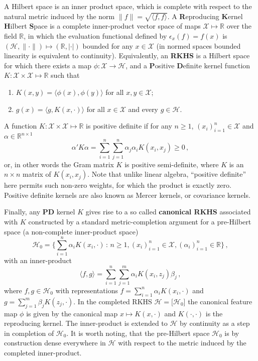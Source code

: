\documentclass{ITaSconf}
\newcommand{\Hcal}{\mathcal{H}}
\newcommand{\Xcal}{\mathcal{X}}
\newcommand{\Real}{\mathbb{R}}
\begin{document}
A Hilbert space is an inner product space, which is complete with respect to the
natural metric induced by the norm $ \|f\| = \sqrt{\langle f, f\rangle} $. A \textbf{R}eproducing
\textbf{K}ernel \textbf{H}ilbert \textbf{S}pace is a complete inner-product vector
space of maps $\Xcal \mapsto \Real$ over the field $\Real$, in which the evaluation
functional defined by $\epsilon_x(f) = f(x)$ is $(\Hcal, \|\cdot\|) \mapsto (\Real, |\cdot|)$
bounded for any $x\in \Xcal$ (in normed spaces bounded linearity is equivalent to
continuity). Equivalently, an \textbf{RKHS} is a Hilbert space for which there exists
a map $\phi:\Xcal\to\Hcal$, and a \textbf{P}ositive \textbf{D}efinite kernel function
$K:\Xcal \times \Xcal \mapsto \Real$ such that \begin{enumerate}
  \item $K(x,y) = \langle \phi(x), \phi(y) \rangle$ for all $x, y\in \Xcal$;
  \item $g(x) = \langle g, K(x, \cdot)\rangle$ for all $x\in \Xcal$ and every
  $g\in \Hcal$.
\end{enumerate}
A function $K:\Xcal \times \Xcal \mapsto \Real$ is positive definite if for any
$n\geq1$, $(x_i)_{i=1}^n \in \Xcal$ and $\alpha \in \Real^{n\times 1}$
\begin{equation*}
  \alpha'K\alpha
    = \sum_{i=1}^n \sum_{j=1}^n \alpha_j \alpha_i K(x_i, x_j)
    \geq 0
    \,,
\end{equation*}
or, in other words the Gram matrix $K$ is positive semi-definite, where $K$ is an
$n \times n$ matrix of $K(x_i, x_j)$. Note that unlike linear algebra, ``positive
definite'' here permits such non-zero weights, for which the product is exactly
zero. Positive definite kernels are also known as Mercer kernels, or covariance
kernels.

Finally, any \textbf{PD} kernel $K$ gives rise to a so called \textbf{canonical RKHS}
associated with $K$ constructed by a standard metric-completion argument for a pre-Hilbert
space (a non-complete inner-product space)
\begin{equation*}
\Hcal_0
  = \bigl\{
    \sum_{i=1}^n \alpha_i K(x_i, \cdot)
    \,:\, n\geq1, (x_i)_{i=1}^n \in \Xcal, (\alpha_i)_{i=1}^n\in \Real
  \bigr\} \,,
\end{equation*}
with an inner-product 
\begin{equation*}
  \langle f, g \rangle = \sum_{i=1}^n \sum_{j=1}^m \alpha_i K(x_i, z_j) \beta_j \,,
\end{equation*}
where $f, g\in \Hcal_0$ with representations $f = \sum_{i=1}^n \alpha_i K(x_i, \cdot)$
and $g = \sum_{j=1}^m \beta_j K(z_j, \cdot)$. In the completed RKHS $\Hcal = \bigl[\Hcal_0\bigr]$
the canonical feature map $\phi$ is given by the canonical map $x\mapsto K(x, \cdot)$
and $K(\cdot, \cdot)$ is the reproducing kernel. The inner-product is extended to
$\Hcal$ by continuity as a step in completion of $\Hcal_0$. It is worth noting, that
the pre-Hilbert space $\Hcal_0$ is by construction dense everywhere in $\Hcal$ with
respect to the metric induced by the completed inner-product.
\end{document}
